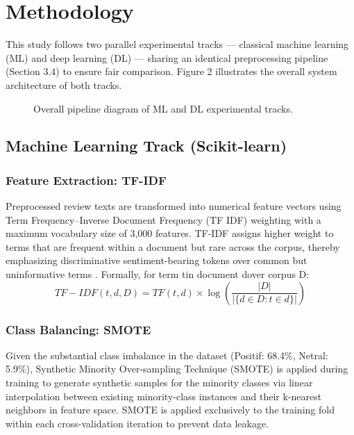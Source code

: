 \documentclass{article}
\begin{document}
\section{Methodology}
\label{sec:method}

This study follows two parallel experimental tracks --- classical machine learning (ML) and deep learning (DL) --- sharing an identical preprocessing pipeline (Section 3.4) to ensure fair comparison. Figure 2 illustrates the overall system architecture of both tracks.

\begin{figure}[H]
\centering
\caption{Overall pipeline diagram of ML and DL experimental tracks.}
\label{fig:overall_pipeline}
\end{figure}

\subsection{Machine Learning Track (Scikit-learn)}
\subsubsection{Feature Extraction: TF-IDF}
Preprocessed review texts are transformed into numerical feature vectors using Term Frequency–Inverse Document Frequency (TF IDF) weighting with a maximum vocabulary size of 3,000 features. TF-IDF assigns higher weight to terms that are frequent within a document but rare across the corpus, thereby emphasizing discriminative sentiment-bearing tokens over common but uninformative terms \cite{pang2008opinion}. Formally, for term tin document dover corpus D:
\begin{equation}
TF-IDF(t,d,D)=TF(t,d)\times \log\left(\frac{|D|}{|\{d\in D:t\in d\}|}\right)
\end{equation}

\subsubsection{Class Balancing: SMOTE}
Given the substantial class imbalance in the dataset (Positif: 68.4\%, Netral: 5.9\%), Synthetic Minority Over-sampling Technique (SMOTE) \cite{chawla2002smote} is applied during training to generate synthetic samples for the minority classes via linear interpolation between existing minority-class instances and their k-nearest neighbors in feature space. SMOTE is applied exclusively to the training fold within each cross-validation iteration to prevent data leakage.
\end{document}
